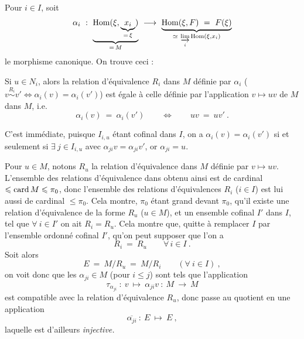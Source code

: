 Pour $i \in I$, soit
\[
\alpha_i \ : \ \underbrace{\mathrm{Hom}(\xi, \underbrace{x_i}_{=\,\xi})}_{=\,M} \ \longrightarrow \ \underbrace{\mathrm{Hom}(\xi,F) \ = \ F(\xi)}_{\simeq\ \varinjlim\limits_{i} \mathrm{Hom}(\xi,x_i)}
\]
le morphisme canonique. On trouve ceci :
\begin{center}
%
\begin{minipage}[c]{0.78\linewidth}
Si $u \in N_i$, alors la relation d'équivalence $R_i$ dans $M$ définie par $\alpha_i$ ($v \overset{R_i}{\sim} v' \Longleftrightarrow \alpha_i(v) = \alpha_i(v')$) est égale à celle définie par l'application $v \longmapsto uv$ de $M$ dans $M$, i.e.
\[
\alpha_i(v) \ = \ \alpha_i(v') \qquad \Longleftrightarrow \qquad uv \ = \ uv' \ .
\]
\end{minipage}
\end{center}

C'est immédiate, puisque $I_{i,u}$ étant cofinal dans $I$, on a $\alpha_i(v) = \alpha_i(v')$ si et seulement si $\exists\ j \in I_{i,u}$ avec $\alpha_{ji}v = \alpha_{ji}v'$, or $\alpha_{ji} = u$. %

Pour $u \in M$, notons $R_u$ la relation d'équivalence dans $M$ définie par $v \longmapsto uv$. L'ensemble des relations d'équivalence dans
obtenu ainsi est de cardinal $\leqslant \operatorname{card} M \leqslant \pi_0$, donc l'ensemble des relations d'équivalences $R_i$ ($i \in I$) est lui aussi de cardinal $\leqslant \pi_0$. Cela montre, $\pi_0$ étant grand devant $\pi_0$, qu'il existe une relation d'équivalence de la forme $R_u$ ($u \in M$), et un ensemble cofinal $I'$ dans $I$, tel que $\forall\ i \in I'$ on ait $R_i = R_u$. Cela montre que, quitte à remplacer $I$ par l'ensemble ordonné cofinal $I'$, qu'on peut supposer que l'on a
\[
R_i \ = \ R_u \qquad \forall\, i \in I \ .
\tag*{(4.15.8.5)}
\]
Soit alors
\[
E \ = \ M/R_u \ = \ M/R_i \qquad (\forall\ i \in I) \ ,
\]
on voit donc que les $\alpha_{ji} \in M$ (pour $i \leqslant j$) sont tels que l'application
\[
\tau_{\alpha_{ji}} \ : \ v \ \longmapsto \ \alpha_{ji}v \ : \ M \ \longrightarrow \ M
\]
est compatible avec la relation d'équivalence $R_u$, donc passe au quotient en une application
\[
\overline{\alpha_{ji}} \ : \ E \ \longmapsto \ E \ ,
\]
laquelle est d'ailleurs \textit{injective.}

